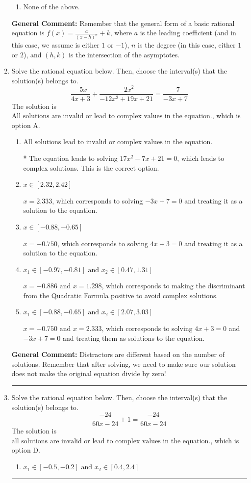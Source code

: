 \documentclass{extbook}[14pt]
\newcommand{\litem}[1]{\item #1

\rule{\textwidth}{0.4pt}}
\begin{document}
\begin{enumerate}
{\begin{enumerate}[label=\Alph*.]
\begin{multicols}{2}
\end{multicols}\item None of the above.\end{enumerate}
\textbf{General Comment:} Remember that the general form of a basic rational equation is $ f(x) = \frac{a}{(x-h)^n} + k$, where $a$ is the leading coefficient (and in this case, we assume is either $1$ or $-1$), $n$ is the degree (in this case, either $1$ or $2$), and $(h, k)$ is the intersection of the asymptotes.
}
\litem{
Solve the rational equation below. Then, choose the interval(s) that the solution(s) belongs to.
\[ \frac{-5x}{4x + 3} + \frac{-2x^{2}}{-12x^{2} +19 x + 21} = \frac{-7}{-3x + 7} \]The solution is \( \text{All solutions are invalid or lead to complex values in the equation.} \), which is option A.\begin{enumerate}[label=\Alph*.]
\item \( \text{All solutions lead to invalid or complex values in the equation.} \)

* The equation leads to solving $17x^{2} -7 x + 21=0$, which leads to complex solutions. This is the correct option.
\item \( x \in [2.32,2.42] \)

$x = 2.333$, which corresponds to solving $-3x + 7 = 0$ and treating it as a solution to the equation.
\item \( x \in [-0.88,-0.65] \)

$x = -0.750$, which corresponds to solving $4x + 3 = 0$ and treating it as a solution to the equation.
\item \( x_1 \in [-0.97, -0.81] \text{ and } x_2 \in [0.47,1.31] \)

$x = -0.886 \text{ and } x = 1.298$, which corresponds to making the discriminant from the Quadratic Formula positive to avoid complex solutions.
\item \( x_1 \in [-0.88, -0.65] \text{ and } x_2 \in [2.07,3.03] \)

$x = -0.750 \text{ and } x = 2.333$, which corresponds to solving $4x + 3 = 0$ and $-3x + 7 = 0$ and treating them as solutions to the equation.
\end{enumerate}

\textbf{General Comment:} Distractors are different based on the number of solutions. Remember that after solving, we need to make sure our solution does not make the original equation divide by zero!
}
\litem{
Solve the rational equation below. Then, choose the interval(s) that the solution(s) belongs to.
\[ \frac{-24}{60x -24} + 1 = \frac{-24}{60x -24} \]The solution is \( \text{all solutions are invalid or lead to complex values in the equation.} \), which is option D.\begin{enumerate}[label=\Alph*.]
\item \( x_1 \in [-0.5, -0.2] \text{ and } x_2 \in [0.4,2.4] \)


\end{enumerate}}
\end{enumerate}
\end{document}

